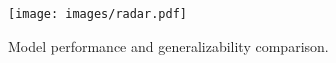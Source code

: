 \begin{figure}[t]
    \centering
    \texttt{[image: images/radar.pdf]}
    \vspace{-.4cm}
    \caption{Model performance and generalizability comparison.}
    \label{fig:radar}
    \vspace{-0.7cm}
\end{figure}